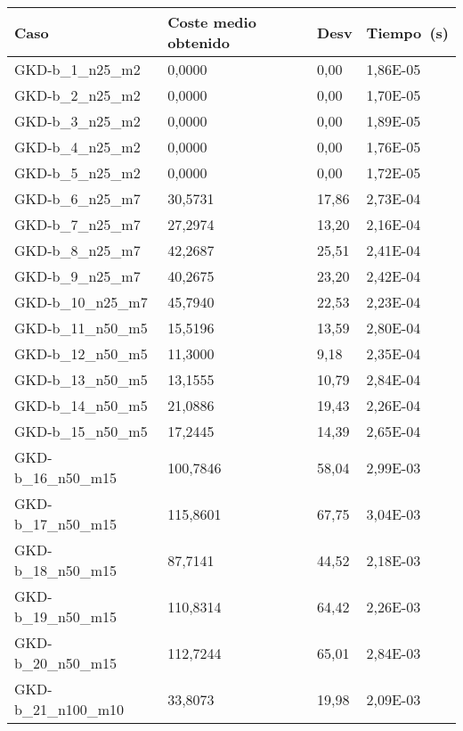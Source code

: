\pagebreak

\begin{table}[!ht]
    \centering
    \begin{adjustbox}{height=12cm}
    \begin{tabular}{|l|l|l|l|}
    \hline
        Caso & Coste medio obtenido & Desv & Tiempo~(s) \\ \hline
        GKD-b\_1\_n25\_m2 & 0,0000 & 0,00 & 1,86E-05 \\ \hline
        GKD-b\_2\_n25\_m2 & 0,0000 & 0,00 & 1,70E-05 \\ \hline
        GKD-b\_3\_n25\_m2 & 0,0000 & 0,00 & 1,89E-05 \\ \hline
        GKD-b\_4\_n25\_m2 & 0,0000 & 0,00 & 1,76E-05 \\ \hline
        GKD-b\_5\_n25\_m2 & 0,0000 & 0,00 & 1,72E-05 \\ \hline
        GKD-b\_6\_n25\_m7 & 30,5731 & 17,86 & 2,73E-04 \\ \hline
        GKD-b\_7\_n25\_m7 & 27,2974 & 13,20 & 2,16E-04 \\ \hline
        GKD-b\_8\_n25\_m7 & 42,2687 & 25,51 & 2,41E-04 \\ \hline
        GKD-b\_9\_n25\_m7 & 40,2675 & 23,20 & 2,42E-04 \\ \hline
        GKD-b\_10\_n25\_m7 & 45,7940 & 22,53 & 2,23E-04 \\ \hline
        GKD-b\_11\_n50\_m5 & 15,5196 & 13,59 & 2,80E-04 \\ \hline
        GKD-b\_12\_n50\_m5 & 11,3000 & 9,18 & 2,35E-04 \\ \hline
        GKD-b\_13\_n50\_m5 & 13,1555 & 10,79 & 2,84E-04 \\ \hline
        GKD-b\_14\_n50\_m5 & 21,0886 & 19,43 & 2,26E-04 \\ \hline
        GKD-b\_15\_n50\_m5 & 17,2445 & 14,39 & 2,65E-04 \\ \hline
        GKD-b\_16\_n50\_m15 & 100,7846 & 58,04 & 2,99E-03 \\ \hline
        GKD-b\_17\_n50\_m15 & 115,8601 & 67,75 & 3,04E-03 \\ \hline
        GKD-b\_18\_n50\_m15 & 87,7141 & 44,52 & 2,18E-03 \\ \hline
        GKD-b\_19\_n50\_m15 & 110,8314 & 64,42 & 2,26E-03 \\ \hline
        GKD-b\_20\_n50\_m15 & 112,7244 & 65,01 & 2,84E-03 \\ \hline
        GKD-b\_21\_n100\_m10 & 33,8073 & 19,98 & 2,09E-03 \\ \hline

\end{tabular}
\end{adjustbox}
\end{table}
